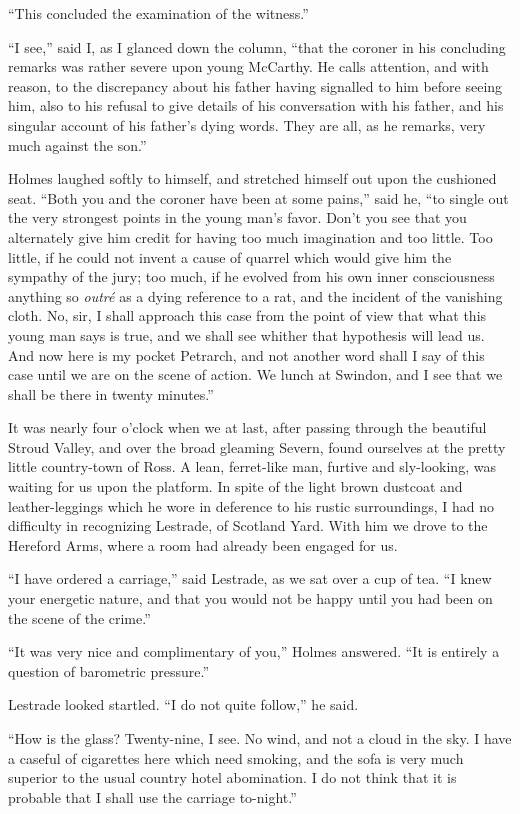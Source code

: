 “This concluded the examination of the witness.”

“I see,” said I, as I glanced down the column, “that the
coroner in his concluding remarks was rather severe upon
young McCarthy. He calls attention, and with reason, to the
discrepancy about his father having signalled to him before
seeing him, also to his refusal to give details of his conversation
with his father, and his singular account of his father’s
dying words. They are all, as he remarks, very much against
the son.”

Holmes laughed softly to himself, and stretched himself out
upon the cushioned seat. “Both you and the coroner have
been at some pains,” said he, “to single out the very strongest
points in the young man’s favor. Don’t you see that you
alternately give him credit for having too much imagination
and too little. Too little, if he could not invent a cause of
quarrel which would give him the sympathy of the jury; too
much, if he evolved from his own inner consciousness anything
so \textit{outré} as a dying reference to a rat, and the incident
of the vanishing cloth. No, sir, I shall approach this case
from the point of view that what this young man says is true,
and we shall see whither that hypothesis will lead us. And
now here is my pocket Petrarch, and not another word shall
I say of this case until we are on the scene of action. We
lunch at Swindon, and I see that we shall be there in twenty
minutes.”

It was nearly four o’clock when we at last, after passing
through the beautiful Stroud Valley, and over the broad gleaming
Severn, found ourselves at the pretty little country-town
of Ross. A lean, ferret-like man, furtive and sly-looking, was
waiting for us upon the platform. In spite of the light brown
dustcoat and leather-leggings which he wore in deference to
his rustic surroundings, I had no difficulty in recognizing
Lestrade, of Scotland Yard. With him we drove to the
Hereford Arms, where a room had already been engaged
for us.

“I have ordered a carriage,” said Lestrade, as we sat over
a cup of tea. “I knew your energetic nature, and that you
would not be happy until you had been on the scene of the
crime.”

“It was very nice and complimentary of you,” Holmes
answered. “It is entirely a question of barometric pressure.”

Lestrade looked startled. “I do not quite follow,” he
said.

“How is the glass? Twenty-nine, I see. No wind, and
not a cloud in the sky. I have a caseful of cigarettes here
which need smoking, and the sofa is very much superior to
the usual country hotel abomination. I do not think that it
is probable that I shall use the carriage to-night.”

